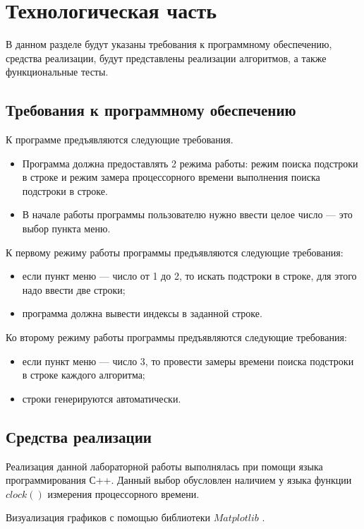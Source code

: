 \chapter{Технологическая часть}

В данном разделе будут указаны требования к программному обеспечению, средства реализации, будут представлены реализации алгоритмов, а также функциональные тесты.

\section{Требования к программному обеспечению}

К программе предъявляются следующие требования.
\begin{itemize}
	\item Программа должна предоставлять 2 режима работы: режим поиска подстроки в строке и режим замера процессорного времени выполнения поиска подстроки в строке.
	\item В начале работы программы пользователю нужно ввести целое число --- это выбор пункта меню.
\end{itemize}

К первому режиму работы программы предъявляются следующие требования:
\begin{itemize}
	\item если пункт меню --- число от 1 до 2, то искать подстроки в строке, для этого надо ввести две строки;
	\item программа должна вывести индексы в заданной строке.
\end{itemize}

Ко второму режиму работы программы предъявляются следующие требования:
\begin{itemize}
	\item если пункт меню --- число 3, то провести замеры времени поиска подстроки в строке каждого алгоритма;
	\item строки генерируются автоматически.
\end{itemize}


\section{Средства реализации}
Реализация данной лабораторной работы выполнялась при помощи языка программирования С++. Данный выбор обусловлен наличием у языка функции $clock()$ измерения процессорного времени.

Визуализация графиков с помощью библиотеки $Matplotlib$ \cite {matplot}.

